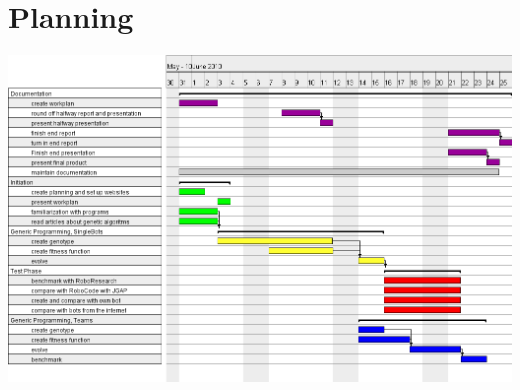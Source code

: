 \documentclass[a4paper,10pt]{article}
\begin{document}
\section{Planning}
\label{planning}
\includegraphics[height=0.75\textwidth, angle=-90]{planning.png}
\end{document}
